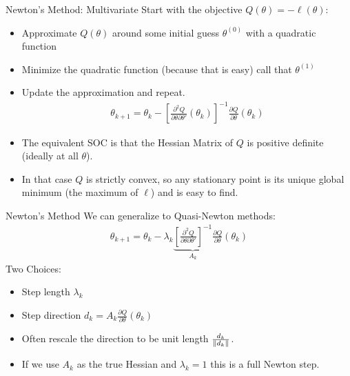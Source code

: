 \documentclass[aspectratio=169,11pt]{beamer}
\begin{document}
\begin{frame}{Newton's Method: Multivariate}
Start with the objective $Q(\theta) = - \ell(\theta)$:
\begin{itemize}
\item Approximate $Q(\theta)$ around some initial guess $\theta^{(0)}$ with a quadratic function
\item Minimize the quadratic function (because that is easy) call that $\theta^{(1)}$
\item Update the approximation and repeat.
\begin{align*}
\theta_{k+1} = \theta_k - \left[ \frac{\partial^2 Q}{\partial \theta \partial \theta'}(\theta_k) \right]^{-1}\frac{\partial Q}{\partial \theta}(\theta_k)
\end{align*}
\item The equivalent SOC is that the {Hessian Matrix} of $Q$ is \alert{positive definite}  (ideally at all $\theta$).
\item In that case $Q$ is \alert{strictly convex}, so any stationary point is its \alert{unique global minimum} (the maximum of $\ell$) and is easy to find.
\end{itemize}
\end{frame}


\begin{frame}{Newton's Method}
We can generalize to Quasi-Newton methods:
\begin{align*}
\theta_{k+1} = \theta_k -  \lambda_k \underbrace{\left[ \frac{\partial^2 Q}{\partial \theta \partial \theta'} \right]^{-1}}_{A_k} \frac{\partial Q}{\partial \theta}(\theta_k)
\end{align*}
Two Choices:
\begin{itemize}
\item Step length $\lambda_k$
\item Step direction $d_k=A_k \frac{\partial Q}{\partial \theta}(\theta_k)$
\item Often rescale the direction to be unit length $\frac{d_k}{\lVert d_k\rVert}$.
\item If we use $A_k$ as the true Hessian and $\lambda_k=1$ this is a \alert{full Newton step}.
\end{itemize}
\end{frame}
\end{document}
